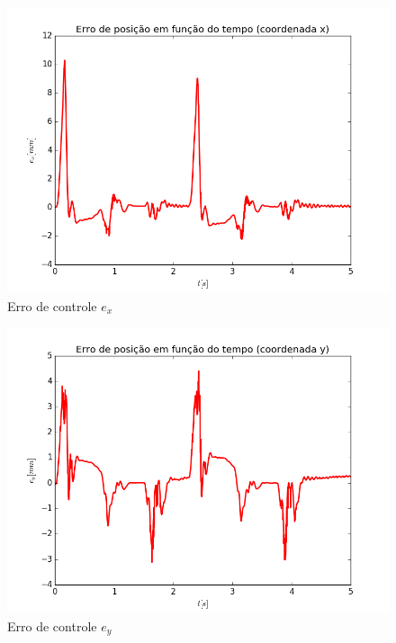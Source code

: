 \documentclass[]{politex}
\begin{document}
\begin{multicols}{2}
\begin{figure}[H]
	\centering
	\includegraphics[scale=0.39]{../../../Experimental/Aquisicoes/CTCt_triangulo/ex.png}  
	\caption{Erro de controle $e_x$}
	\label{fig:CTCq_triangulo_ex}
\end{figure}
\begin{figure}[H]
	\centering
	\includegraphics[scale=0.39]{../../../Experimental/Aquisicoes/CTCt_triangulo/ey.png}  
	\caption{Erro de controle $e_y$}
	\label{fig:CTCq_triangulo_ey}
\end{figure}
\end{multicols}
\end{document}
